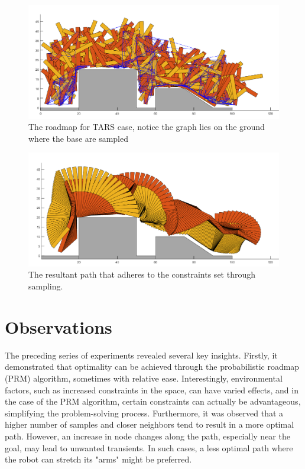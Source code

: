 \documentclass{IEEEtaes}
\begin{document}
\begin{figure}[bh!]
    \begin{center}
        \includegraphics[width=0.8\linewidth]{figures/TARS-2.pdf}
     \end{center}
     \vspace{-1em}
     \caption{The roadmap for TARS case, notice the graph lies on the ground where the base are sampled}
     \label{tars-2}
     \vspace{-1em}
\end{figure}

\begin{figure}[bh!]
    \begin{center}
        \includegraphics[width=0.8\linewidth]{figures/TARS-1.pdf}
     \end{center}
     \vspace{-1em}
     \caption{The resultant path that adheres to the constraints set through sampling.}
     \label{tars-1}
     \vspace{-1em}
\end{figure}

\section{\large \textbf{Observations}}
The preceding series of experiments revealed several key insights. Firstly, it demonstrated that optimality can be achieved through the probabilistic roadmap (PRM) algorithm, sometimes with relative ease. Interestingly, environmental factors, such as increased constraints in the space, can have varied effects, and in the case of the PRM algorithm, certain constraints can actually be advantageous, simplifying the problem-solving process. Furthermore, it was observed that a higher number of samples and closer neighbors tend to result in a more optimal path. However, an increase in node changes along the path, especially near the goal, may lead to unwanted transients. In such cases, a less optimal path where the robot can stretch its "arms" might be preferred.
\end{document}
